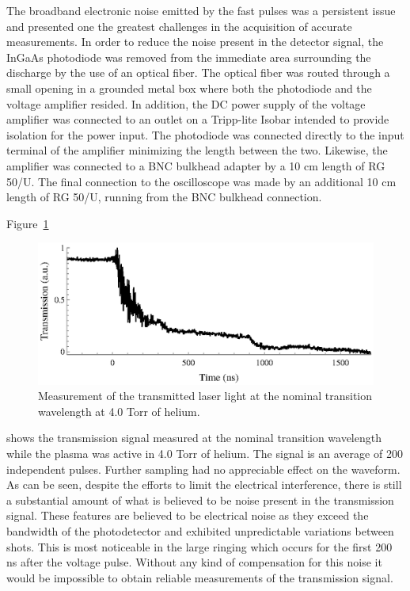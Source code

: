 The broadband electronic noise emitted by the fast pulses was a persistent issue
and presented one the greatest challenges in the acquisition of accurate
measurements. In order to reduce the noise present in the detector signal, the
InGaAs photodiode was removed from the immediate area surrounding the discharge
by the use of an optical fiber. The optical fiber was routed through a small
opening in a grounded metal box where both the photodiode and the voltage
amplifier resided. In addition, the DC power supply of the voltage amplifier was
connected to an outlet on a Tripp-lite Isobar intended to provide isolation for
the power input. The photodiode was connected directly to the input terminal of
the amplifier minimizing the length between the two. Likewise, the amplifier was
connected to a BNC bulkhead adapter by a 10 cm length of RG 50/U. The final
connection to the oscilloscope was made by an additional 10 cm length of RG
50/U, running from the BNC bulkhead connection.

Figure~\ref{fig:transmitted}
\begin{figure}
  \centering
  \includegraphics{./chapters/metastables/figures/transmitted.eps}
  \caption{Measurement of the transmitted laser light at the nominal transition
  wavelength at 4.0 Torr of helium.}
  \label{fig:transmitted}
\end{figure}
shows the transmission signal measured at the nominal transition wavelength
while the plasma was active in 4.0 Torr of helium. The signal is an average of
200 independent pulses. Further sampling had no appreciable effect on the
waveform. As can be seen, despite the efforts to limit the electrical
interference, there is still a substantial amount of what is believed to be
noise present in the transmission signal. These features are believed to be
electrical noise as they exceed the bandwidth of the photodetector and exhibited
unpredictable variations between shots. This is most noticeable in the large
ringing which occurs for the first 200 ns after the voltage pulse. Without any
kind of compensation for this noise it would be impossible to obtain reliable
measurements of the transmission signal.

